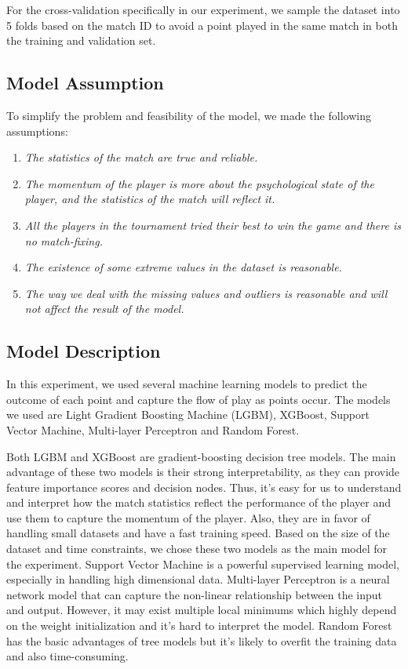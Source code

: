 \documentclass[12pt]{article}
\begin{document}
For the cross-validation specifically in our experiment, we sample the dataset into 5 folds based on the match ID to avoid a point played in the same match in both the training and validation set. 

\subsection{Model Assumption}
\quad To simplify the problem and feasibility of the model, we made the following assumptions:
\begin{enumerate}
    \item \textit{The statistics of the match are true and reliable.}
    \item \textit{The momentum of the player is more about the psychological state of the player, and the statistics of the match will reflect it.}
    \item \textit{All the players in the tournament tried their best to win the game and there is no match-fixing.}
    \item \textit{The existence of some extreme values in the dataset is reasonable.}
    \item \textit{The way we deal with the missing values and outliers is reasonable and will not affect the result of the model.}
\end{enumerate}

\subsection{Model Description}
\quad In this experiment, we used several machine learning models to predict the outcome of each point and capture the flow of play as points occur. The models we used are Light Gradient Boosting Machine (LGBM)\cite{GBM-model}, XGBoost\cite{XGB-model}, Support Vector Machine\cite{svm-model}, Multi-layer Perceptron\cite{multilayer-model} and Random Forest\cite{forest-model}.

Both LGBM and XGBoost are gradient-boosting decision tree models. The main advantage of these two models is their strong interpretability, as they can provide feature importance scores and decision nodes.
Thus, it's easy for us to understand and interpret how the match statistics reflect the performance of the player and use them to capture the momentum of the player. Also, they are in favor of handling small
datasets and have a fast training speed. Based on the size of the dataset and time constraints, we chose these two models as the main model for the experiment. Support Vector Machine is a powerful supervised 
learning model, especially in handling high dimensional data. Multi-layer Perceptron is a neural network model that can capture the non-linear relationship between the input and output. However, it may exist multiple
local minimums which highly depend on the weight initialization and it's hard to interpret the model. Random Forest has the basic advantages of tree models but it's likely to overfit the training data and also
time-consuming. 
\end{document}
